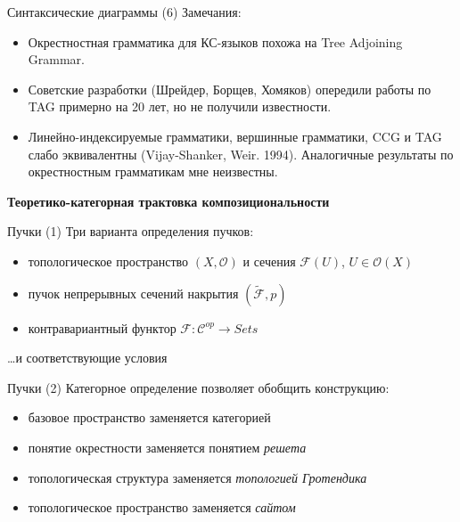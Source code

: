 \documentclass{beamer}
\begin{document}
\begin{frame}{Синтаксические диаграммы (6)}
Замечания:\\
\medskip
\begin{small}
\begin{itemize}
	\item Окрестностная грамматика для КС-языков похожа на Tree Adjoining Grammar.
	\item Советские разработки (Шрейдер, Борщев, Хомяков) опередили работы по TAG примерно на 20 лет, но не получили известности.
	\item Линейно-индексируемые грамматики, вершинные грамматики, CCG и TAG слабо эквивалентны (Vijay-Shanker, Weir. 1994). Аналогичные результаты по окрестностным грамматикам мне неизвестны.
\end{itemize}
\end{small}
\end{frame}




\begin{frame}{}
\begin{center}
	\textbf{Теоретико-категорная трактовка композициональности}
\end{center}
\end{frame}

\begin{frame}{Пучки (1)}
Три варианта определения пучков:\\
\medskip
\begin{small}
\begin{itemize}
	\item топологическое пространство $(X, \mathcal{O})$ и сечения $\mathcal{F}(U)$, $U \in \mathcal{O}(X)$
	\item пучок непрерывных сечений накрытия $(\widetilde{\mathcal{F}}, p)$
	\item контравариантный функтор $\mathcal{F} : \mathcal{C}^{op} \to Sets$
\end{itemize}
\end{small}
\medskip
\dots и соответствующие условия
\end{frame}

\begin{frame}{Пучки (2)}
Категорное определение позволяет обобщить конструкцию:\\
\medskip
\begin{small}
\begin{itemize}
	\item базовое пространство заменяется категорией
	\item понятие окрестности заменяется понятием \textit{решета}
	\item топологическая структура заменяется \textit{топологией Гротендика}
	\item топологическое пространство заменяется \textit{сайтом}
\end{itemize}
\end{small}
\end{frame}
\end{document}
